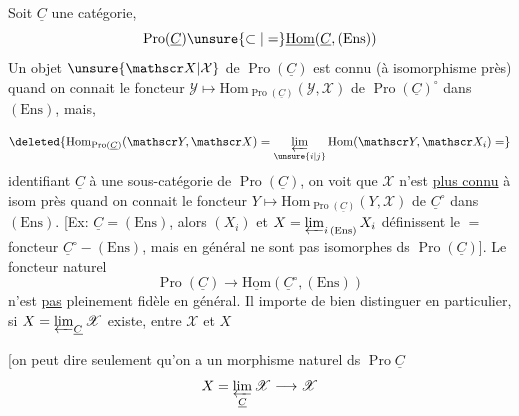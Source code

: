 
Soit $\underline C$ une catégorie, 
\[
\operatorname{Pro}(\underline C)\unsure{\subset|=}\underline{\mathrm{Hom}}(\underline C,(\mathrm{Ens}))
\]
Un objet $\unsure{\mathscr X|\mathcal X}$ de $\operatorname{Pro}(\underline C)$ est connu (à isomorphisme près) quand on connait le foncteur $\mathscr Y\mapsto\mathrm{Hom}_{\operatorname{Pro}(\underline C)}(\mathscr Y,\mathscr X)$ de $\operatorname{Pro}(\underline C)^\circ$ dans $(\mathrm{Ens})$,  mais,

\[
\deleted{\mathrm{Hom}_{\operatorname{Pro}(\underline C)}(\mathscr Y,\mathscr X)=\varprojlim_{\unsure{i|j}}\mathrm{Hom}(\mathscr Y,\mathscr X_i)=}
\]
identifiant $\underline C$ à une sous-catégorie de $\operatorname{Pro}(\underline C)$, on voit que $\mathscr X$ n'est \uline{plus connu} à isom près quand on connait le foncteur $Y\mapsto\mathrm{Hom}_{\operatorname{Pro}(\underline C)}(Y,\mathscr X)$ de $\underline C^\circ$ dans $(\mathrm{Ens})$. [Ex: $\underline C=(\mathrm{Ens})$, alors $(X_i)$ et $X=\varprojlim_{i\,(\mathrm{Ens})}X_i$ définissent le $=$ foncteur $\underline C^\circ\mathbin{-}(\mathrm{Ens})$, mais en général ne sont pas isomorphes ds $\operatorname{Pro}(\underline C)$]. Le foncteur naturel
\[
\operatorname{Pro}(\underline C)\longrightarrow\underline{\mathrm{Hom}}(\underline C^\circ,(\mathrm{Ens}))
\]
n'est  \uline{pas} pleinement fidèle en général. Il importe de bien distinguer en particulier, si $X=\varprojlim_{\underline C}\mathscr X$ existe, entre $\mathscr X$ et $X$

[on peut dire seulement qu'on a un morphisme naturel ds $\operatorname{Pro}\underline C$
\[
X=\varprojlim_{\underline C}\mathscr X\longrightarrow\mathscr X
\]

